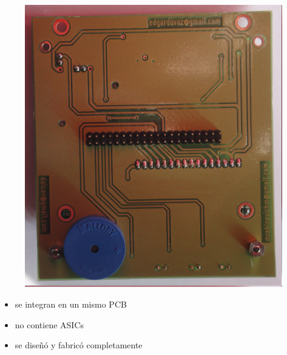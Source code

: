 \documentclass{beamer}
\begin{document}
\begin{frame}
\begin{figure}
{			\includegraphics[scale=.033]{Imagenes/SCUI_b.jpg} }
	\end{figure}

\begin{itemize}
\item se integran en un mismo PCB
\item no contiene ASICs
\item se diseñó y fabricó completamente
\end{itemize}
\end{frame}
\end{document}
